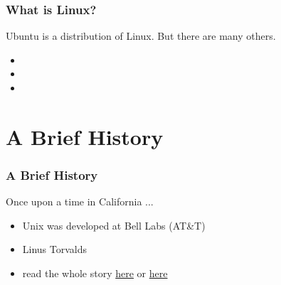 \documentclass[fleqn]{beamer} %
\newcommand{\sectiontitleI}{What is Linux?} %
\newcommand{\sectiontitleII}{A Brief History}
\begin{document}
	\begin{frame} \small
		\frametitle{\sectiontitleI}
			Ubuntu is a {\BL distribution} of Linux. But there are many others. 
            \begin{itemize}
                \item 
                \item 
                \item 
            \end{itemize} 

	\end{frame}
		
\section{\sectiontitleII}	

	\begin{frame}[label=sectionII] \small
		\frametitle{\sectiontitleII}
			Once upon a time in California ...
            \begin{itemize}
                \item Unix was developed at Bell Labs (AT\&T) 
                \item Linus Torvalds   
                \item read the whole story \href{https://en.wikipedia.org/wiki/History_of_Linux}{here} or \href{https://www.bell-labs.com/var/articles/invention-unix/}{here}
            \end{itemize} 

	\end{frame}
		
\end{document}
